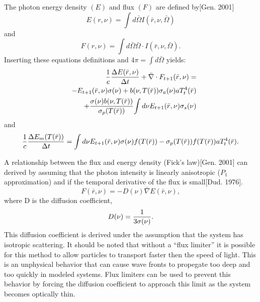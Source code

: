 	The photon energy density $(E)$ and flux $(F)$ are defined by[Gen. 2001]
	\begin{equation}
	E(r,\nu)=\int{d\bar{\Omega}}I(\bar{r},\nu,\bar{\Omega})
	\end{equation}
	and
	\begin{equation}
	F(r,\nu)=\int{d\bar{\Omega}}\bar{\Omega}\cdot{I(\bar{r},\nu,\bar{\Omega})}.
	\end{equation}
	Inserting these equations definitions and $4\pi=\int{d\bar{\Omega}}$ yields:
	\begin{eqnarray}
	\label{finalDiffusion}
	& &{1\over{c}}{\Delta{E(\bar{r},\nu)}\over{\Delta{t}}} + \bar{\nabla}\cdot{F_{t+1}(\bar{r},\nu)}=\nonumber \\& & -E_{t+1}(\bar{r},\nu)\sigma(\nu)+{b(\nu,T(\bar{r}))}\sigma_a(\nu) aT_t^4(\bar{r})\nonumber \\& & +{\sigma(\nu)b(\nu,T(\bar{r}))\over{\sigma_p(T(\bar{r}))}}{\int{d\nu}E_{t+1}(\bar{r},\nu)\sigma_s(\nu)}
	\end{eqnarray}
	and
	\begin{equation}
	\label{EqState}
	{1\over{c}}{\Delta{E_m(T(\bar{r}))}\over{\Delta{t}}}=\int{d\nu}E_{t+1}(\bar{r},\nu)\sigma(\nu)f(T(\bar{r}))-\sigma_p(T(\bar{r}))f(T(\bar{r})){aT_t^4(\bar{r})}.
	\end{equation}
	
	A relationship between the flux and energy density (Fick's law)[Gen. 2001] can derived by assuming that the photon intensity is linearly anisotropic ($P_1$ approximation) and if the temporal derivative of the flux is small[Dud. 1976]. 
	\begin{equation}
	\label{FicksLaw}
	F(\bar{r},\nu)=-D(\nu)\bar{\nabla}{E(\bar{r},\nu)},  
	\end{equation}
	where D is the diffusion coefficient,
	\begin{equation}
	\label{DiffusionCoefficent}
	D(\nu)={1\over{3\sigma(\nu)}}.
	\end{equation}
	This diffusion coefficient is derived under the assumption that the system has isotropic scattering. It should be noted that without a ``flux limiter'' it is possible for this method to allow particles to transport faster then the speed of light. This is an unphysical behavior that can cause wave fronts to propegate too deep and too quickly in modeled systems. Flux limiters can be used to prevent this behavior by forcing the diffusion coefficient to approach this limit as the system becomes optically thin. 

\belowSubSecSkip

